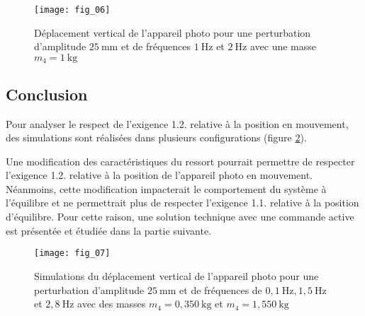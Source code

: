 \begin{figure}[H]
\centering
\texttt{[image: fig\_06]}
\caption{\label{fig:06} Déplacement vertical de l'appareil photo pour une perturbation d'amplitude $25 \mathrm{~mm}$ et de fréquences $1 \mathrm{~Hz}$ et $2 \mathrm{~Hz}$ avec une masse $m_{4}=1 \mathrm{~kg}$}
\end{figure}



\ifprof
\begin{corrige}
\end{corrige}
\else
\fi

\subsection{Conclusion}
Pour analyser le respect de l'exigence 1.2. relative à la position en mouvement, des simulations sont réalisées dans plusieurs configurations (figure \ref{fig:07}).

\ifprof
\begin{corrige}
\end{corrige}
\else
\fi

Une modification des caractéristiques du ressort pourrait permettre de respecter l'exigence 1.2. relative à la position de l'appareil photo en mouvement. Néanmoins, cette modification impacterait le comportement du système à l'équilibre et ne permettrait plus de respecter l'exigence 1.1. relative à la position d'équilibre. Pour cette raison, une solution technique avec une commande active est présentée et étudiée dans la partie suivante.


\begin{figure}[H]
\centering
\texttt{[image: fig\_07]}
\caption{\label{fig:07} Simulations du déplacement vertical de l'appareil photo pour une perturbation d'amplitude $25 \mathrm{~mm}$ et de fréquences de $0,1 \mathrm{~Hz}, 1,5 \mathrm{~Hz}$ et $2,8 \mathrm{~Hz}$ avec des masses $m_{4}=0,350 \mathrm{~kg}$ et $m_{4}=1,550 \mathrm{~kg}$
}
\end{figure}



